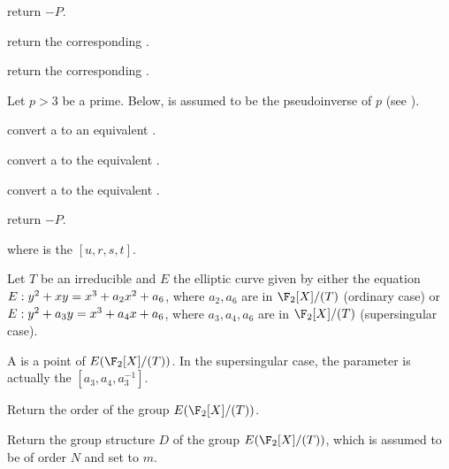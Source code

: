  return $-P$.

 return the corresponding .

 return the corresponding .


Let $p > 3$ be a prime. Below,  is assumed to be the pseudoinverse
of $p$ (see ).

 convert a  to an equivalent .

 convert a  to the equivalent
.

 convert a  to the
equivalent .



 return $-P$.



where  is the  $[u,r,s,t]$.


Let $T$ be an irreducible  and $E$ the
elliptic curve given by either the equation
$E:y^2+x\*y=x^3+a_2\*x^2+a_6$, where $a_2, a_6$ are  in
$\F_2[X]/(T)$ (ordinary case) or $E:y^2+a_3\*y=x^3+a_4\*x+a_6$, where
$a_3, a_4, a_6$ are  in $\F_2[X]/(T)$ (supersingular case).

A  is a point of $E(\F_2[X]/(T))$.  In the supersingular case, the
parameter  is actually the  $[a_3,a_4,a_3^{-1}]$.

Return the order of the group $E(\F_2[X]/(T))$.

Return the group structure $D$ of the group $E(\F_2[X]/(T))$,
which is assumed to be of order $N$ and set  to $m$.

